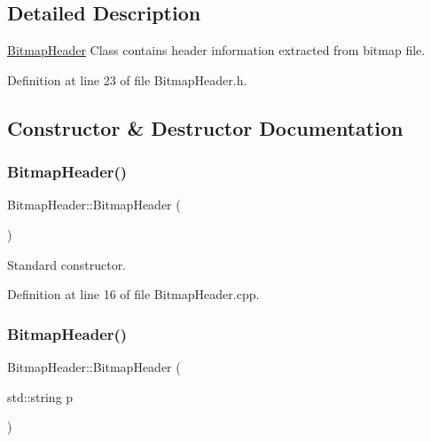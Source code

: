 \subsection{Detailed Description}
\mbox{\hyperlink{classBitmapHeader}{Bitmap\+Header}} Class contains header information extracted from bitmap file. 

Definition at line 23 of file Bitmap\+Header.\+h.



\subsection{Constructor \& Destructor Documentation}
\mbox{\label{classBitmapHeader_a216e4a8485db7865be70c996f37e4c7d}} 
\subsubsection{\texorpdfstring{BitmapHeader()}{BitmapHeader()}\hspace{0.1cm}{\footnotesize\ttfamily [1/4]}}
{\footnotesize\ttfamily Bitmap\+Header\+::\+Bitmap\+Header (\begin{DoxyParamCaption}{ }\end{DoxyParamCaption})}



Standard constructor. 



Definition at line 16 of file Bitmap\+Header.\+cpp.

\mbox{\label{classBitmapHeader_a47ccc09b3e744ecc81588b034718e21a}} 
\subsubsection{\texorpdfstring{BitmapHeader()}{BitmapHeader()}\hspace{0.1cm}{\footnotesize\ttfamily [2/4]}}
{\footnotesize\ttfamily Bitmap\+Header\+::\+Bitmap\+Header (\begin{DoxyParamCaption}\item[{std\+::string}]{p }\end{DoxyParamCaption})}



